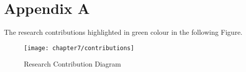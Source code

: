 
\chapter{Appendix A} %

\label{AppendixA} %


The research contributions highlighted in green colour in the following Figure.

\begin{figure}[H]
\centering
\texttt{[image: chapter7/contributions]}
\caption{Research Contribution Diagram}
\end{figure}